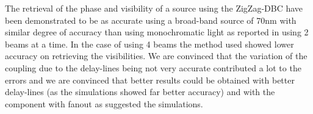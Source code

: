 The retrieval of the phase and visibility of a source using the ZigZag-DBC have been demonstrated to be as accurate using a broad-band source of 70nm with similar degree of accuracy than using monochromatic light as reported in \cite{Diener2017} using 2 beams at a time. In the case of using 4 beams the method used showed lower accuracy on retrieving the visibilities. We are convinced that the variation of the coupling due to the delay-lines being not very accurate contributed a lot to the errors and we are convinced that better results could be obtained with better delay-lines (as the simulations showed far better accuracy) and with the component with fanout as suggested the simulations.   
